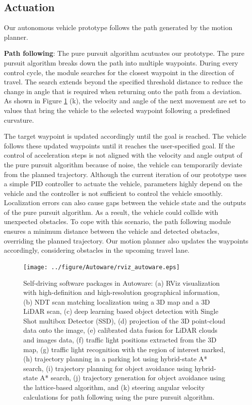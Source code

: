 \subsection{Actuation}
\label{sec:actuation}
Our autonomous vehicle prototype follows the path generated by the motion planner.

\textbf{Path following}:
The pure pursuit algorithm \cite{coulter1992implementation} acutuates our prototype.
The pure pursuit algorithm breaks down the path into multiple waypoints.
During every control cycle, the module searches for the closest waypoint in the direction of travel.
The search extends beyond the specified threshold distance to reduce the change in angle that is required when returning onto the path from a deviation.
As shown in Figure \ref{fig:rviz_autoware} (k), the velocity and angle of the next movement are set to values that bring the vehicle to the selected waypoint following a predefined curvature.

The target waypoint is updated accordingly until the goal is reached.
The vehicle follows these updated waypoints until it reaches the user-specified goal.
If the control of acceleration steps is not aligned with the velocity and angle output of the pure pursuit algorithm because of noise, the vehicle can temporarily deviate from the planned trajectory.
Although the current iteration of our prototype uses a simple PID controller to actuate the vehicle, parameters highly depend on the vehicle and the controller is not sufficient to control the vehicle smoothly.
Localization errors can also cause gaps between the vehicle state and the outputs of the pure pursuit algorithm.
As a result, the vehicle could collide with unexpected obstacles.
To cope with this scenario, the path following module ensures a minimum distance between the vehicle and detected obstacles, overriding the planned trajectory.
Our motion planner also updates the waypoints accordingly, considering obstacles in the upcoming travel lane.

\clearpage

\begin{figure}[!htbp]
  \centering
  \texttt{[image: ../figure/Autoware/rviz\_autoware.eps]}
  \caption{\label{fig:rviz_autoware}
  Self-driving software packages in Autoware:
  (a) RViz visualization with high-definition and high-resolution geographical information,
  (b) NDT scan matching localization using a 3D map and a 3D LiDAR scan,
  (c) deep learning based object detection with Single Shot multibox Detector (SSD),
  (d) projection of the 3D point-cloud data onto the image,
  (e) calibrated data fusion for LiDAR clouds and images data,
  (f) traffic light positions extracted from the 3D map,
  (g) traffic light recognition with the region of interest marked,
  (h) trajectory planning in a parking lot using hybrid-state A* search,
  (i) trajectory planning for object avoidance using hybrid-state A* search,
  (j) trajectory generation for object avoidance using the lattice-based algorithm, and
  (k) steering angular velocity calculations for path following using the pure pursuit algorithm.}
\end{figure}
